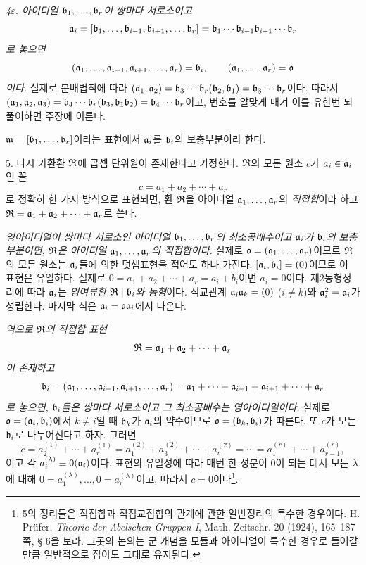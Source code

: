 \emph{4\(\varepsilon\). 아이디얼 \(\mathfrak{b}_1,\ldots,\mathfrak{b}_r\)이 쌍마다 서로소이고
\[
\mathfrak{a}_i=[\mathfrak{b}_1,\ldots,\mathfrak{b}_{i-1},\mathfrak{b}_{i+1},\ldots,\mathfrak{b}_r]
      =\mathfrak{b}_1\cdots\mathfrak{b}_{i-1}\mathfrak{b}_{i+1}\cdots\mathfrak{b}_r
\]
로 놓으면
\[
(\mathfrak{a}_1,\ldots,\mathfrak{a}_{i-1},\mathfrak{a}_{i+1},\ldots,\mathfrak{a}_r)=\mathfrak{b}_i,
\qquad
(\mathfrak{a}_1,\ldots,\mathfrak{a}_r)=\mathfrak{o}
\]
이다.}
실제로 분배법칙에 따라 \((\mathfrak{a}_1,\mathfrak{a}_2)=\mathfrak{b}_3\cdots\mathfrak{b}_r(\mathfrak{b}_2,\mathfrak{b}_1)=\mathfrak{b}_3\cdots\mathfrak{b}_r\)이다. 따라서 \((\mathfrak{a}_1,\mathfrak{a}_2,\mathfrak{a}_3)=\mathfrak{b}_4\cdots\mathfrak{b}_r(\mathfrak{b}_3,\mathfrak{b}_1\mathfrak{b}_2)=\mathfrak{b}_4\cdots\mathfrak{b}_r\)이고, 번호를 알맞게 매겨 이를 유한번 되풀이하면 주장에 이른다.

\(\mathfrak{m}=[\mathfrak{b}_1,\ldots,\mathfrak{b}_r]\)이라는 표현에서 \(\mathfrak{a}_i\)를 \(\mathfrak{b}_i\)의 보충부분이라 한다.

5. 다시 가환환 \(\mathfrak{R}\)에 곱셈 단위원이 존재한다고 가정한다. \(\mathfrak{R}\)의 모든 원소 \(c\)가 \(a_i\in\mathfrak{a}_i\)인 꼴
\[
        c=a_1+a_2+\cdots+a_r
\]
로 정확히 한 가지 방식으로 표현되면, 환 \(\mathfrak{R}\)을 아이디얼 \(\mathfrak{a}_1,\ldots,\mathfrak{a}_r\)의 \emph{직접합}이라 하고 \(\mathfrak{R}=\mathfrak{a}_1+\mathfrak{a}_2+\cdots+\mathfrak{a}_r\)로 쓴다.

\emph{영아이디얼이 쌍마다 서로소인 아이디얼 \(\mathfrak{b}_1,\ldots,\mathfrak{b}_r\)의 최소공배수이고 \(\mathfrak{a}_i\)가 \(\mathfrak{b}_i\)의 보충부분이면, \(\mathfrak{R}\)은 아이디얼 \(\mathfrak{a}_1,\ldots,\mathfrak{a}_r\)의 직접합이다.} 실제로 \(\mathfrak{o}=(\mathfrak{a}_1,\ldots,\mathfrak{a}_r)\)이므로 \(\mathfrak{R}\)의 모든 원소는 \(\mathfrak{a}_i\)들에 의한 덧셈표현을 적어도 하나 가진다. \([\mathfrak{a}_i,\mathfrak{b}_i]=(0)\)이므로 이 표현은 유일하다. 실제로 \(0=a_1+a_2+\cdots+a_r=a_i+b_i\)이면 \(a_i=0\)이다. 제2동형정리에 따라 \(\mathfrak{a}_i\)는 \emph{잉여류환 \(\mathfrak{R}\mid\mathfrak{b}_i\)와 동형}이다. \glqq{}직교관계\grqq{} \(\mathfrak{a}_i\mathfrak{a}_k=(0)\) (\(i\ne k\))와 \(\mathfrak{a}_i^2=\mathfrak{a}_i\)가 성립한다. 마지막 식은 \(\mathfrak{a}_i=\mathfrak{o}\mathfrak{a}_i\)에서 나온다.

\emph{역으로 \(\mathfrak{R}\)의 직접합 표현
\[
        \mathfrak{R}=\mathfrak{a}_1+\mathfrak{a}_2+\cdots+\mathfrak{a}_r
\]
이 존재하고
\[
\mathfrak{b}_i=(\mathfrak{a}_1,\ldots,\mathfrak{a}_{i-1},\mathfrak{a}_{i+1},\ldots,\mathfrak{a}_r)
     =\mathfrak{a}_1+\cdots+\mathfrak{a}_{i-1}+\mathfrak{a}_{i+1}+\cdots+\mathfrak{a}_r
\]
로 놓으면, \(\mathfrak{b}_i\)들은 쌍마다 서로소이고 그 최소공배수는 영아이디얼이다.}
실제로 \(\mathfrak{o}=(\mathfrak{a}_i,\mathfrak{b}_i)\)에서 \(k\ne i\)일 때 \(\mathfrak{b}_k\)가 \(\mathfrak{a}_i\)의 약수이므로 \(\mathfrak{o}=(\mathfrak{b}_k,\mathfrak{b}_i)\)가 따른다. 또 \(c\)가 모든 \(\mathfrak{b}_i\)로 나누어진다고 하자. 그러면
\[
 c=a_2^{(1)}+\cdots+a_r^{(1)}
  =a_1^{(2)}+a_3^{(2)}+\cdots+a_r^{(2)}
  =\cdots
  =a_1^{(r)}+\cdots+a_{r-1}^{(r)},
\]
이고 각 \(a_i^{(\lambda)}\equiv0(\mathfrak{a}_i)\)이다. 표현의 유일성에 따라 매번 한 성분이 0이 되는 데서 모든 \(\lambda\)에 대해 \(0=a_1^{(\lambda)},\ldots,0=a_r^{(\lambda)}\)이고, 따라서 \(c=0\)이다\footnote{5의 정리들은 직접합과 직접교집합의 관계에 관한 일반정리의 특수한 경우이다. H. Prüfer, \emph{Theorie der Abelschen Gruppen I}, Math. Zeitschr. 20 (1924), 165--187쪽, § 6을 보라. 그곳의 논의는 군 개념을 모듈과 아이디얼이 특수한 경우로 들어갈 만큼 일반적으로 잡아도 그대로 유지된다.}.

